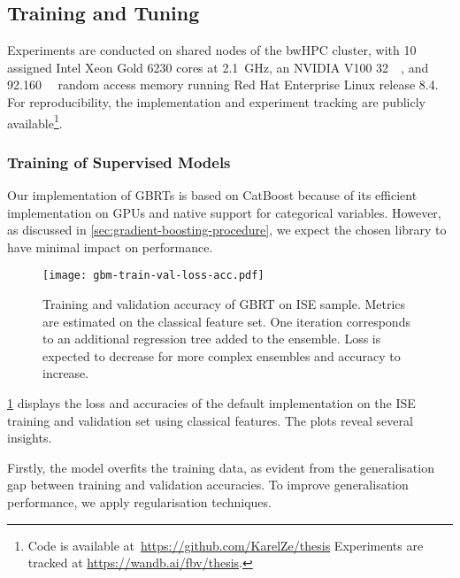\subsection{Training and Tuning}\label{sec:training-and-tuning}

Experiments are conducted on shared nodes of the bwHPC cluster, with 10 assigned Intel Xeon Gold 6230 cores at \SI{2.1}{\GHz}, an NVIDIA V100 \SI{32}{\giga\byte}, and \SI{92.160}{\giga\byte} random access memory running Red Hat Enterprise Linux release 8.4. For reproducibility, the implementation and experiment tracking are publicly available\footnote{Code is available at~\url{https://github.com/KarelZe/thesis} Experiments are tracked at \url{https://wandb.ai/fbv/thesis}.}.

\subsubsection{Training of Supervised
    Models}\label{sec:training-of-supervised-models}

Our implementation of \glspl{GBRT} is based on CatBoost \autocite[][5--6]{prokhorenkovaCatBoostUnbiasedBoosting2018} because of its efficient implementation on \glspl{GPU} and native support for categorical variables. However, as discussed in \cref{sec:gradient-boosting-procedure}, we expect the chosen library to have minimal impact on performance.

\begin{figure}[ht]
    \centering
    \texttt{[image: gbm-train-val-loss-acc.pdf]}
    \caption[Training and Validation Accuracy of  on  Sample]{Training and validation accuracy of \gls{GBRT} on \gls{ISE} sample. Metrics are estimated on the classical feature set. One iteration corresponds to an additional regression tree added to the ensemble. Loss is expected to decrease for more complex ensembles and accuracy to increase.}
    \label{fig:gbm-train-val-loss-acc}
\end{figure}

\cref{fig:gbm-train-val-loss-acc} displays the loss and accuracies of the default implementation on the \gls{ISE} training and validation set using classical features. The plots reveal several insights. 

Firstly, the model overfits the training data, as evident from the generalisation gap between training and validation accuracies. To improve generalisation performance, we apply regularisation techniques. 

